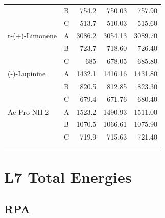 \documentclass[journal=jctcce,manuscript=article]{achemso}
\begin{document}
\begin{spacing}{1}
\begin{longtable}{llRRR}
          & B     & 754.2 & 750.03 & 757.90 \\
          & C     & 513.7 & 510.03 & 515.60 \\
    r-(+)-Limonene & A     & 3086.2 & 3054.13 & 3089.70 \\
          & B     & 723.7 & 718.60 & 726.40 \\
          & C     & 685   & 678.05 & 685.80 \\
    (-)-Lupinine & A     & 1432.1 & 1416.16 & 1431.80 \\
          & B     & 820.5 & 812.85 & 823.30 \\
          & C     & 679.4 & 671.76 & 680.40 \\
    Ac-Pro-NH 2 & A     & 1523.2 & 1490.93 & 1511.00 \\
          & B     & 1070.5 & 1066.61 & 1075.90 \\
    & C     & 719.9 & 715.63 & 721.40 \\
    \hline
  \label{tab:tpss_rot34}
\end{longtable}

\section{L7 Total Energies}

\subsection{RPA}


\end{spacing}
\end{document}
